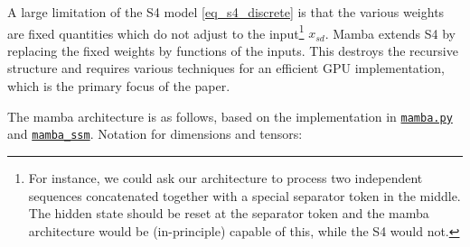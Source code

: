 \documentclass[11pt]{article}
\begin{document}
A large limitation of the S4 model \eqref{eq_s4_discrete} is that the various weights are fixed
quantities which do not adjust to the input\footnote{For instance, we could ask our architecture to
    process two independent sequences concatenated together with a special separator token in the
    middle. The hidden state should be reset at the separator token and the mamba architecture would
be (in-principle) capable of this, while the S4 would not.} $ x _{ sd }  $. Mamba \cite{mamba}
extends S4 by replacing the fixed weights by functions of the inputs. This destroys the recursive
structure and requires various techniques for an efficient GPU implementation, which is the primary
focus of the paper.

The mamba architecture is as follows, based on the implementation in
\href{https://github.com/alxndrTL/mamba.py}{\texttt{mamba.py}} and
\href{https://github.com/state-spaces/mamba}{\texttt{mamba\_ssm}}.  Notation for dimensions and
tensors:
\end{document}
